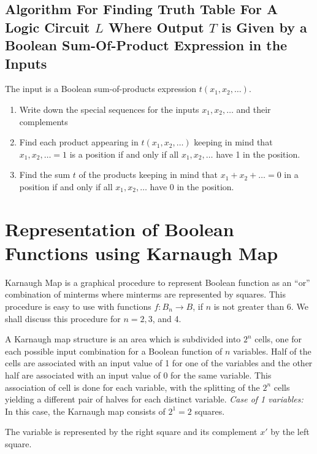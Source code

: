 \documentclass[../main-sheet.tex]{subfiles}
\begin{document}
\subsection{Algorithm For Finding Truth Table For A Logic Circuit $ L $ Where Output $ T $ is Given by a Boolean Sum-Of-Product Expression in the Inputs}
The input is a Boolean sum-of-products expression $ t(x_1,x_2,\dots) $.
\begin{enumerate}[label=Step \arabic*:]
    \item Write down the special sequences for the inputs $ x_1 , x_2,\dots $ and their complements
    \item Find each product appearing in $ t(x_1,x_2,\dots) $ keeping in mind that $x_1,x_2,\dots= 1$ is a position if and only if all $ x_1 , x_2 ,\dots$ have 1 in the position.
    \item Find the sum $ t $ of the products keeping in mind that $ x_1+x_2+\dots=0 $ in a position if and only if all $ x_1 , x_2 ,\dots$ have 0 in the position.
\end{enumerate}
\section{Representation of Boolean Functions using Karnaugh Map}
Karnaugh Map is a graphical procedure to represent Boolean function as an ``or'' combination of minterms where minterms are represented by squares. This procedure is easy to use with functions $ f: B_n \to B $, if $ n $ is not greater than 6. We shall discuss this procedure for $ n = 2, 3 $, and 4.

A Karnaugh map structure is an area which is subdivided into $ 2^n $ cells, one for each possible input combination for a Boolean function of $ n $ variables. Half of the cells are associated with an input value of 1 for one of the variables and the other half are associated with an input value of 0 for the same variable. This association of cell is done for each variable, with the splitting of the $ 2^n $ cells yielding a different pair of halves for each distinct variable.
\newpage
\emph{Case of 1 variables:} In this case, the Karnaugh map consists of $ 2^1=2 $ squares.
\begin{center}
\end{center}
The variable is represented by the right square and its complement $ x' $ by the left square.
\end{document}
